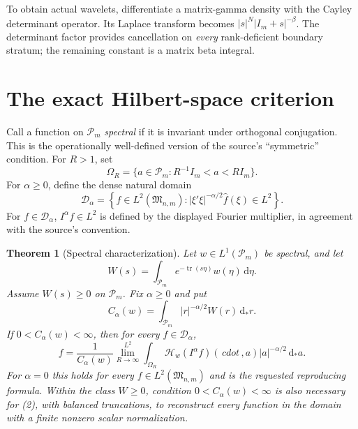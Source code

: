 \documentclass[11pt]{article}
\newtheorem{theorem}{Theorem}
\theoremstyle{remark}
\newcommand{\Pm}{\mathcal P_m}
\newcommand{\Mn}{\mathfrak M_{n,m}}
\newcommand{\tr}{\operatorname{tr}}
\newcommand{\dd}{\,\mathrm d}
\newcommand{\Hc}{\mathcal H}
\newcommand{\Id}{I_m}
\begin{document}
To obtain actual wavelets, differentiate a matrix-gamma density with the
Cayley determinant operator.  Its Laplace transform becomes
$|s|^N|\Id+s|^{-\beta}$.  The determinant factor provides cancellation on
\emph{every} rank-deficient boundary stratum; the remaining constant is a
matrix beta integral.

\section{The exact Hilbert-space criterion}

Call a function on $\Pm$ \emph{spectral} if it is invariant under orthogonal
conjugation.  This is the operationally well-defined version of the source's
``symmetric'' condition.  For $R>1$, set
\[
 \Omega_R=\{a\in\Pm:R^{-1}\Id<a<R\Id\}.
\]
For $\alpha\geq0$, define the dense natural domain
\[
 \mathcal D_\alpha=
 \left\{f\in L^2(\Mn): |\xi'\xi|^{-\alpha/2}\widehat f(\xi)\in L^2\right\}.
\]
For $f\in\mathcal D_\alpha$, $I^\alpha f\in L^2$ is defined by the displayed
Fourier multiplier, in agreement with the source's convention.

\begin{theorem}[Spectral characterization]\label{thm:criterion}
Let $w\in L^1(\Pm)$ be spectral, and let
\[
 W(s)=\int_{\Pm}e^{-\tr(s\eta)}w(\eta)\dd\eta.
\]
Assume $W(s)\geq0$ on $\Pm$.  Fix $\alpha\geq0$ and put
\[
 C_\alpha(w)=\int_{\Pm}|r|^{-\alpha/2}W(r)\dd_*r.                 \tag{1}
\]
If $0<C_\alpha(w)<\infty$, then for every $f\in\mathcal D_\alpha$,
\[
 f=\frac1{C_\alpha(w)}\lim_{R\to\infty}^{L^2}
 \int_{\Omega_R}\Hc_w(I^\alpha f)(\,cdot\,,a)
 |a|^{-\alpha/2}\dd_*a.                                        \tag{2}
\]
For $\alpha=0$ this holds for every $f\in L^2(\Mn)$ and is the requested
reproducing formula.  Within the class $W\geq0$, condition
$0<C_\alpha(w)<\infty$ is also necessary for (2), with balanced truncations,
to reconstruct every function in the domain with a finite nonzero scalar
normalization.
\end{theorem}
\end{document}
